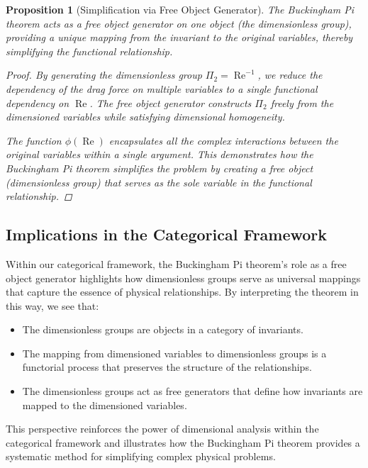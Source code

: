 \documentclass{article}
\newtheorem{proposition}{Proposition}[section]
\theoremstyle{definition}
\theoremstyle{remark}
\begin{document}
	\begin{proposition}[Simplification via Free Object Generator]
		The Buckingham Pi theorem acts as a free object generator on one object (the dimensionless group), providing a unique mapping from the invariant to the original variables, thereby simplifying the functional relationship.
		
		\begin{proof}
			By generating the dimensionless group $\Pi_2 = \operatorname{Re}^{-1}$, we reduce the dependency of the drag force on multiple variables to a single functional dependency on $\operatorname{Re}$. The free object generator constructs $\Pi_2$ freely from the dimensioned variables while satisfying dimensional homogeneity.
			
			The function $\phi(\operatorname{Re})$ encapsulates all the complex interactions between the original variables within a single argument. This demonstrates how the Buckingham Pi theorem simplifies the problem by creating a free object (dimensionless group) that serves as the sole variable in the functional relationship.
		\end{proof}
	\end{proposition}
	
	\subsection{Implications in the Categorical Framework}
	
	Within our categorical framework, the Buckingham Pi theorem's role as a free object generator highlights how dimensionless groups serve as universal mappings that capture the essence of physical relationships. By interpreting the theorem in this way, we see that:
	
	\begin{itemize}
		\item The dimensionless groups are objects in a category of invariants.
		\item The mapping from dimensioned variables to dimensionless groups is a functorial process that preserves the structure of the relationships.
		\item The dimensionless groups act as free generators that define how invariants are mapped to the dimensioned variables.
	\end{itemize}
	
	This perspective reinforces the power of dimensional analysis within the categorical framework and illustrates how the Buckingham Pi theorem provides a systematic method for simplifying complex physical problems.
	
\end{document}
